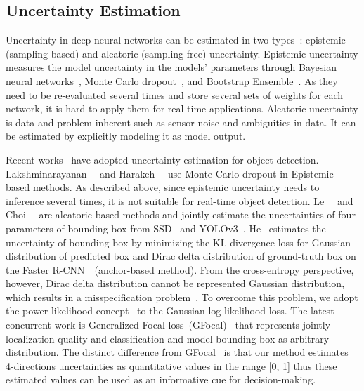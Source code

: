 \documentclass[final]{cvpr}
\begin{document}
\subsection{Uncertainty Estimation}
Uncertainty in deep neural networks can be estimated in two types~\cite{gal2016uncertainty,kendall2017uncertainties,le2018uncertainty}: epistemic (sampling-based) and aleatoric (sampling-free) uncertainty.
Epistemic uncertainty measures the model uncertainty in the models' parameters through Bayesian neural networks~\cite{shridhar2019comprehensive}, Monte Carlo dropout~\cite{gal2016dropout}, and Bootstrap Ensemble~\cite{lakshminarayanan2017simple}.
As they need to be re-evaluated several times and store several sets of weights for each network, it is hard to apply them for real-time applications. 
Aleatoric uncertainty is data and problem inherent such as sensor noise and ambiguities in data.
It can be estimated by explicitly modeling it as model output.

Recent works~\cite{he2019bounding,le2018uncertainty,harakeh2019bayesod,lakshminarayanan2017simple} have adopted uncertainty estimation for object detection.
Lakshminarayanan~\etal~\cite{lakshminarayanan2017simple} and Harakeh~\etal~\cite{harakeh2019bayesod} use Monte Carlo dropout in Epistemic based methods.
As described above, since epistemic uncertainty needs to inference several times, it is not suitable for real-time object detection.
Le~\etal~\cite{le2018uncertainty} and Choi~\etal~\cite{choi2019gaussian} are aleatoric based methods and jointly estimate the uncertainties of four parameters of bounding box from SSD~\cite{liu2016ssd} and YOLOv3~\cite{redmon2018yolov3}.
He~\cite{he2019bounding} estimates the uncertainty of bounding box by minimizing the KL-divergence loss for Gaussian distribution of predicted box and Dirac delta distribution of ground-truth box on the Faster R-CNN~\cite{ren2015faster}~(anchor-based method).
From the cross-entropy perspective, however, Dirac delta distribution cannot be represented Gaussian distribution, which results in a misspecification problem~\cite{holmes2017assigning}.
To overcome this problem, we adopt the power likelihood concept~\cite{holmes2017assigning} to the Gaussian log-likelihood loss.
The latest concurrent work is Generalized Focal loss~(GFocal)~\cite{li2020generalized} that represents jointly localization quality and classification and model bounding box as arbitrary distribution.
The distinct difference from GFocal~\cite{li2020generalized} is that our method estimates 4-directions uncertainties as quantitative values in the range [0, 1] thus these estimated values can be used as an informative cue for decision-making.
\end{document}
